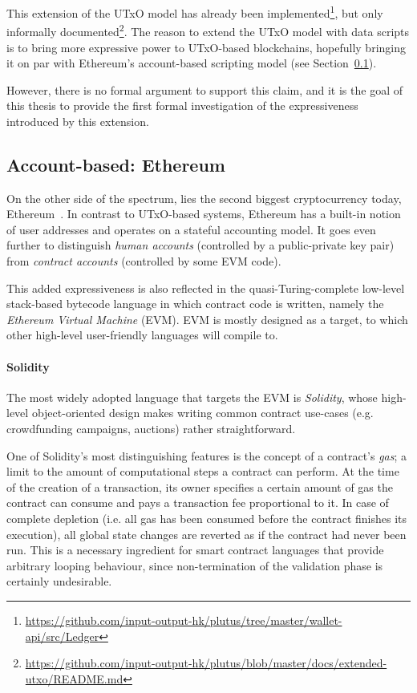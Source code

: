 \documentclass[acmsmall,nonacm=true,screen=true]{acmart}
\newcommand\site[1]{\footnote{\url{#1}}}
\begin{document}
This extension of the UTxO model has already been
implemented\site{https://github.com/input-output-hk/plutus/tree/master/wallet-api/src/Ledger}, but
only informally documented\site{https://github.com/input-output-hk/plutus/blob/master/docs/extended-utxo/README.md}.
The reason to extend the UTxO model with data scripts is to bring more expressive power to UTxO-based blockchains,
hopefully bringing it on par with Ethereum's account-based scripting model (see Section~\ref{subsec:ethereum}).

However, there is no formal argument to support this claim, and it is the goal of this thesis
to provide the first formal investigation of the expressiveness introduced by this extension.

\subsection{Account-based: Ethereum} \label{subsec:ethereum}
On the other side of the spectrum, lies the second biggest cryptocurrency today, Ethereum~\cite{ethereum}.
In contrast to UTxO-based systems, Ethereum has a built-in notion of user addresses and operates on a
stateful accounting model. It goes even further to distinguish \textit{human accounts}
(controlled by a public-private key pair) from \textit{contract accounts} (controlled by some EVM code).

This added expressiveness is also reflected in the quasi-Turing-complete low-level stack-based bytecode language
in which contract code is written, namely the \textit{Ethereum Virtual Machine} (EVM).
EVM is mostly designed as a target, to which other high-level user-friendly languages will compile to.

\paragraph{Solidity}
The most widely adopted language that targets the EVM is \textit{Solidity},
whose high-level object-oriented design makes writing common contract use-cases (e.g. crowdfunding campaigns, auctions)
rather straightforward.

One of Solidity's most distinguishing features is the concept of a contract's \textit{gas}; a limit to the amount
of computational steps a contract can perform.
At the time of the creation of a transaction, its owner specifies a certain amount of gas the contract can consume and
pays a transaction fee proportional to it. In case of complete depletion (i.e. all gas has been consumed before the contract
finishes its execution), all global state changes are reverted as if the contract had never been run.
This is a necessary ingredient for smart contract languages that provide
arbitrary looping behaviour, since non-termination of the validation phase is certainly undesirable.
\end{document}
